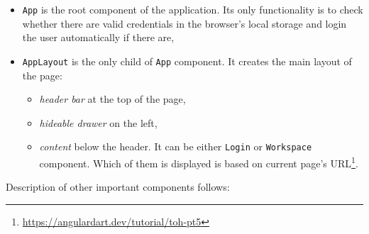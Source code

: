 \begin{itemize}
    \item \texttt{App} is the root component of the application. Its only functionality is to check whether there are valid credentials in the browser's local storage and login the user automatically if there are,
    
    \item \texttt{AppLayout} is the only child of \texttt{App} component. It creates the main layout of the page:
    \begin{itemize}
        \item \textit{header bar} at the top of the page,
        \item \textit{hideable drawer} on the left,
        \item \textit{content} below the header. It can be either \texttt{Login} or \texttt{Workspace} component. Which of them is displayed is based on current page's URL\footnote{\url{https://angulardart.dev/tutorial/toh-pt5}}.
    \end{itemize} 
    
\end{itemize}
Description of other important components follows:

